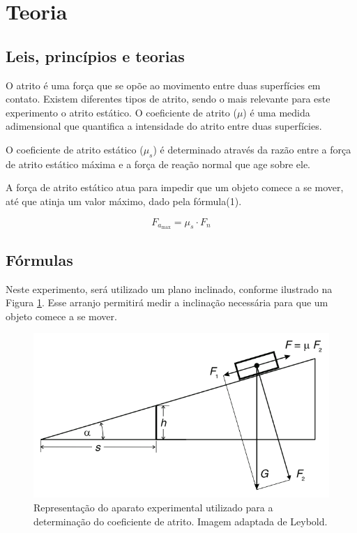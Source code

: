 \documentclass[aps,twocolumn,secnumarabic,balancelastpage,amsmath,amssymb,nofootinbib,floatfix]{revtex4-1}
\begin{document}
    \section{Teoria}
        \subsection{Leis, princípios e teorias}

        \par O atrito é uma força que se opõe ao movimento entre duas superfícies em contato. Existem diferentes tipos de atrito, sendo o mais relevante para este experimento o atrito estático. O coeficiente de atrito (\(\mu\)) é uma medida adimensional que quantifica a intensidade do atrito entre duas superfícies.       
        \par O coeficiente de atrito estático (\(\mu_s\)) é determinado através da razão entre a força de atrito estático máxima e a força de reação normal que age sobre ele.
        \par A força de atrito estático atua para impedir que um objeto comece a se mover, até que atinja um valor máximo, dado pela fórmula(1).

        \begin{equation}
             F_{a_{\text{max}}} = \mu_s \cdot F_n
            \label{eq:Força de atrito estático}
        \end{equation}
        
        \subsection{Fórmulas}

        \par Neste experimento, será utilizado um plano inclinado, conforme ilustrado na Figura \ref{fig:aparato}. Esse arranjo permitirá medir a inclinação necessária para que um objeto comece a se mover.
        
        \begin{figure}[h]
            \centering
            \includegraphics[width=.5\textwidth]{images/Labdefis.png}
            \caption{Representação do aparato experimental utilizado para a determinação do coeficiente de atrito. Imagem adaptada de Leybold.}
            \label{fig:aparato}
        \end{figure}
\end{document}
